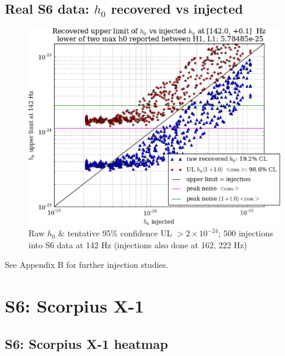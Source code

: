 \subsection{Real S6 data: $h_0$ recovered vs injected}

\begin{figure}
\begin{center}
\includegraphics[width=0.4\paperwidth,height=0.2\paperheight]{plots/h0UL-vs-h0injected-142-0Hz.eps}
\caption{
Raw $h_0$ \& tentative 95\% confidence UL $>2\times10^{-24}$; 500 injections
into S6 data at 142 Hz (injections also done at 162, 222 Hz)}
\end{center}
\end{figure}

See Appendix B for further injection studies.

\section{S6: Scorpius X-1}

\subsection{S6: Scorpius X-1 heatmap}

